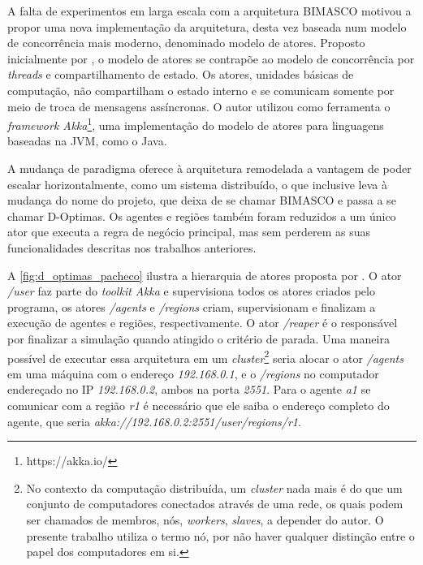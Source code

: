 A falta de experimentos em larga escala com a arquitetura BIMASCO motivou  a propor uma nova implementação da arquitetura, desta vez baseada num modelo de concorrência mais moderno, denominado modelo de atores. Proposto inicialmente por , o modelo de atores se contrapõe ao modelo de concorrência por \textit{threads} e compartilhamento de estado. Os atores, unidades básicas de computação, não compartilham o estado interno e se comunicam somente por meio de troca de mensagens assíncronas. O autor utilizou como ferramenta o \textit{framework Akka}\footnote{https://akka.io/}, uma implementação do modelo de atores para linguagens baseadas na JVM, como o Java. 

A mudança de paradigma oferece à arquitetura remodelada a vantagem de poder escalar horizontalmente, como um sistema distribuído, o que inclusive leva à mudança do nome do projeto, que deixa de se chamar BIMASCO e passa a se chamar D-Optimas. Os agentes e regiões também foram reduzidos a um único ator que executa a regra de negócio principal, mas sem perderem as suas funcionalidades descritas nos trabalhos anteriores. 

A \autoref{fig:d_optimas_pacheco} ilustra a hierarquia de atores proposta por . O ator \textit{/user} faz parte do \textit{toolkit Akka} e supervisiona todos os atores criados pelo programa, os atores \textit{/agents} e \textit{/regions} criam, supervisionam e finalizam a execução de agentes e regiões, respectivamente. O ator \textit{/reaper} é o responsável por finalizar a simulação quando atingido o critério de parada. Uma maneira possível de executar essa arquitetura em um \textit{cluster}\footnote{No contexto da computação distribuída, um \textit{cluster} nada mais é do que um conjunto de computadores conectados através de uma rede, os quais podem ser chamados de membros, nós, \textit{workers}, \textit{slaves}, a depender do autor. O presente trabalho utiliza o termo nó, por não haver qualquer distinção entre o papel dos computadores em si. } seria alocar o ator \textit{/agents} em uma máquina com o endereço \textit{192.168.0.1}, e o \textit{/regions} no computador endereçado no IP \textit{192.168.0.2}, ambos na porta \textit{2551}. Para o agente \textit{a1} se comunicar com a região \textit{r1} é necessário que ele saiba o endereço completo do agente, que seria \textit{akka://192.168.0.2:2551/user/regions/r1}.


